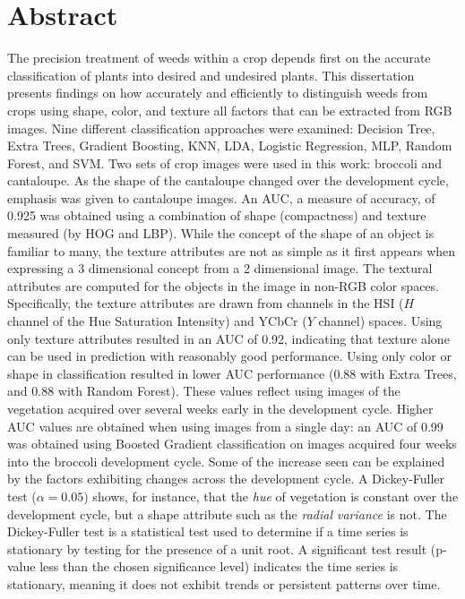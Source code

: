 \documentclass[letterpaper]{report}
\begin{document}
\clearpage
\setlength{\glsdescwidth}{0.95\linewidth}

\printglossary[type=acronym]

\newpage

\section*{Abstract}
The precision treatment of weeds within a crop depends first on the accurate classification of plants into desired and undesired plants. This dissertation presents findings on how accurately and efficiently to distinguish weeds from crops using shape, color, and texture all factors that can be extracted from RGB images.  Nine different classification approaches were examined: Decision Tree, Extra Trees, Gradient Boosting, \gls{KNN}, \gls{LDA}, Logistic Regression, \gls{MLP}, Random Forest, and \gls{SVM}. Two sets of crop images were used in  this work: broccoli and cantaloupe. As the shape of the cantaloupe changed over the development cycle, emphasis was given to cantaloupe images. An \gls{AUC}, a measure of accuracy, of 0.925 was obtained using a combination of shape (compactness) and texture measured (by \gls{HOG} and \gls{LBP}).  While the concept of the shape of an object is familiar to many, the texture attributes are not as simple as it first appears when expressing a 3 dimensional concept from a 2 dimensional image. The textural attributes are computed for the objects in the image in non-RGB color spaces. Specifically, the texture attributes are drawn from channels in the \gls{HSI} ($H$ channel of the Hue Saturation Intensity) and YCbCr ($Y$ channel) spaces. Using only texture attributes resulted in an AUC of 0.92, indicating that texture alone can be used in prediction with reasonably good performance. Using only color or shape in classification resulted in lower AUC performance ($0.88$ with Extra Trees, and $0.88$ with Random Forest). These values reflect using images of the vegetation acquired over several weeks early in the development cycle. Higher AUC values are obtained when using images from a single day: an AUC of 0.99 was obtained using Boosted Gradient classification on images acquired four weeks into the broccoli development cycle. Some of the increase seen can be explained by the factors exhibiting changes across the development cycle. A Dickey-Fuller test ($\alpha = 0.05$) shows, for instance, that the \textit{hue} of vegetation is constant over the development cycle, but a shape attribute such as the \textit{radial variance} is not. The Dickey-Fuller test is a statistical test used to determine if a time series is stationary by testing for the presence of a unit root. A significant test result (p-value less than the chosen significance level) indicates the time series is stationary, meaning it does not exhibit trends or persistent patterns over time.
\end{document}
